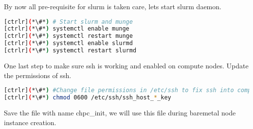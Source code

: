 By now all pre-requisite for slurm is taken care, lets start slurm daemon.


\begin{lstlisting}[language=bash,keywords={}]
[ctrlr](*\#*) # Start slurm and munge 
[ctrlr](*\#*) systemctl enable munge
[ctrlr](*\#*) systemctl restart munge
[ctrlr](*\#*) systemctl enable slurmd
[ctrlr](*\#*) systemctl restart slurmd
\end{lstlisting}

One last step to make sure ssh is working and enabled on compute nodes. Update the permissions 
of ssh.


\begin{lstlisting}[language=bash,keywords={}]
[ctrlr](*\#*) #Change file permissions in /etc/ssh to fix ssh into compute node
[ctrlr](*\#*) chmod 0600 /etc/ssh/ssh_host_*_key
\end{lstlisting}

Save the file with name chpc\_init, we will use this file during baremetal node instance creation.

